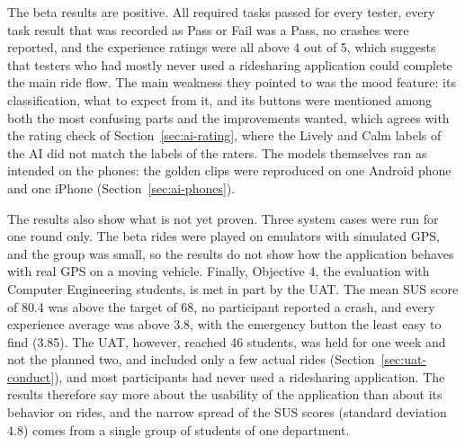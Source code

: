 The beta results are positive. All required tasks passed for every tester, every task result that was recorded as Pass or Fail was a Pass, no crashes were reported, and the experience ratings were all above 4 out of 5, which suggests that testers who had mostly never used a ridesharing application could complete the main ride flow. The main weakness they pointed to was the mood feature: its classification, what to expect from it, and its buttons were mentioned among both the most confusing parts and the improvements wanted, which agrees with the rating check of Section~\ref{sec:ai-rating}, where the Lively and Calm labels of the AI did not match the labels of the raters. The models themselves ran as intended on the phones: the golden clips were reproduced on one Android phone and one iPhone (Section~\ref{sec:ai-phones}).

The results also show what is not yet proven. Three system cases were run for one round only. The beta rides were played on emulators with simulated GPS, and the group was small, so the results do not show how the application behaves with real GPS on a moving vehicle. Finally, Objective 4, the evaluation with Computer Engineering students, is met in part by the UAT. The mean SUS score of 80.4 was above the target of 68, no participant reported a crash, and every experience average was above 3.8, with the emergency button the least easy to find (3.85). The UAT, however, reached 46 students, was held for one week and not the planned two, and included only a few actual rides (Section~\ref{sec:uat-conduct}), and most participants had never used a ridesharing application. The results therefore say more about the usability of the application than about its behavior on rides, and the narrow spread of the SUS scores (standard deviation 4.8) comes from a single group of students of one department. 
